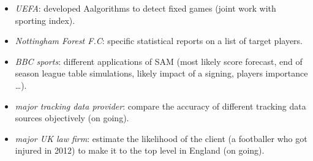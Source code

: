 \documentclass[a4paper,twoside,11pt]{article}
\begin{document}
\begin{itemize}
\item \emph{UEFA}: developed Aalgorithms to detect fixed games (joint work with sporting index).

\item \emph{Nottingham Forest F.C}: specific statistical reports on a list of target players.

\item \emph{BBC sports}: different applications of SAM (most likely score forecast, end
of season league table simulations, likely impact of a signing, players
importance \ldots{}).

\item \emph{major tracking data provider}: compare the accuracy of different tracking
data sources objectively (on going).

\item \emph{major UK law firm}: estimate the likelihood of the client (a footballer who
got injured in 2012) to make it to the top level in England (on going).
\end{itemize}
\end{document}
